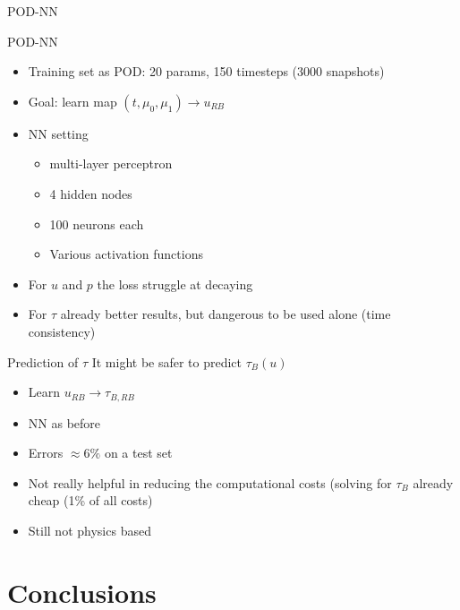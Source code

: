 \documentclass[9pt,compress,t,aspectratio=169]{beamer}
\newcommand{\1}{\begin{pmatrix}
		1\\
		1
\end{pmatrix}}
\begin{document}
\begin{frame}{POD-NN}
	\begin{minipage}{0.49\textwidth}
		\begin{block}{POD-NN}
			\begin{itemize}
				\item Training set as POD: 20 params, 150 timesteps (3000 snapshots)
				\item Goal: learn map $(t,\mu_0,\mu_1)\to u_{RB}$
				\item NN setting 
				\begin{itemize}
					\item multi-layer perceptron 
					\item 4 hidden nodes 
					\item 100 neurons each
					\item Various activation functions
				\end{itemize}
				\item For $u$ and $p$ the loss struggle at decaying
				\item For $\tau$ already better results, but dangerous to be used alone (time consistency)
			\end{itemize}
		\end{block}
	\end{minipage}\hfill
	\begin{minipage}{0.49\textwidth}
	\begin{block}{Prediction of $\tau$}
		It might be safer to predict $\tau_B(u)$
		\begin{itemize}
			\item Learn $u_{RB}\to \tau_{B,RB}$
			\item NN as before
			\item Errors $\approx 6\%$ on a test set
			\item Not really helpful in reducing the computational costs (solving for $\tau_B$ already cheap (1\% of all costs)
			\item Still not physics based
		\end{itemize}
	\end{block}
\end{minipage}
\end{frame}


\section{Conclusions}
\end{document}
